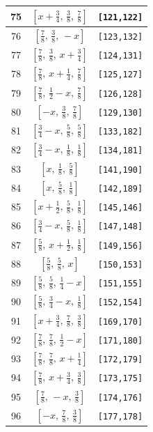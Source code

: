 \documentclass[fleqn,8pt]{jsarticle}
\begin{document}
\begin{longtable}{ccc}
75 & $\left[ x + \frac{3}{4},\, \frac{3}{8},\, \frac{7}{8} \right]$ & {\tt [121,122]} \\ \hline
76 & $\left[ \frac{7}{8},\, \frac{3}{8},\, - x \right]$ & {\tt [123,132]} \\ \hline
77 & $\left[ \frac{7}{8},\, \frac{3}{8},\, x + \frac{3}{4} \right]$ & {\tt [124,131]} \\ \hline
78 & $\left[ \frac{7}{8},\, x + \frac{1}{4},\, \frac{7}{8} \right]$ & {\tt [125,127]} \\ \hline
79 & $\left[ \frac{7}{8},\, \frac{1}{2} - x,\, \frac{7}{8} \right]$ & {\tt [126,128]} \\ \hline
80 & $\left[ - x,\, \frac{3}{8},\, \frac{7}{8} \right]$ & {\tt [129,130]} \\ \hline
81 & $\left[ \frac{3}{4} - x,\, \frac{5}{8},\, \frac{5}{8} \right]$ & {\tt [133,182]} \\ \hline
82 & $\left[ \frac{3}{4} - x,\, \frac{1}{8},\, \frac{1}{8} \right]$ & {\tt [134,181]} \\ \hline
83 & $\left[ x,\, \frac{1}{8},\, \frac{5}{8} \right]$ & {\tt [141,190]} \\ \hline
84 & $\left[ x,\, \frac{5}{8},\, \frac{1}{8} \right]$ & {\tt [142,189]} \\ \hline
85 & $\left[ x + \frac{1}{2},\, \frac{5}{8},\, \frac{1}{8} \right]$ & {\tt [145,146]} \\ \hline
86 & $\left[ \frac{3}{4} - x,\, \frac{5}{8},\, \frac{1}{8} \right]$ & {\tt [147,148]} \\ \hline
87 & $\left[ \frac{5}{8},\, x + \frac{1}{2},\, \frac{1}{8} \right]$ & {\tt [149,156]} \\ \hline
88 & $\left[ \frac{5}{8},\, \frac{5}{8},\, x \right]$ & {\tt [150,153]} \\ \hline
89 & $\left[ \frac{5}{8},\, \frac{5}{8},\, \frac{1}{4} - x \right]$ & {\tt [151,155]} \\ \hline
90 & $\left[ \frac{5}{8},\, \frac{3}{4} - x,\, \frac{1}{8} \right]$ & {\tt [152,154]} \\ \hline
91 & $\left[ x + \frac{3}{4},\, \frac{7}{8},\, \frac{3}{8} \right]$ & {\tt [169,170]} \\ \hline
92 & $\left[ \frac{7}{8},\, \frac{7}{8},\, \frac{1}{2} - x \right]$ & {\tt [171,180]} \\ \hline
93 & $\left[ \frac{7}{8},\, \frac{7}{8},\, x + \frac{1}{4} \right]$ & {\tt [172,179]} \\ \hline
94 & $\left[ \frac{7}{8},\, x + \frac{3}{4},\, \frac{3}{8} \right]$ & {\tt [173,175]} \\ \hline
95 & $\left[ \frac{7}{8},\, - x,\, \frac{3}{8} \right]$ & {\tt [174,176]} \\ \hline
96 & $\left[ - x,\, \frac{7}{8},\, \frac{3}{8} \right]$ & {\tt [177,178]} \\
\end{longtable}
\end{document}
